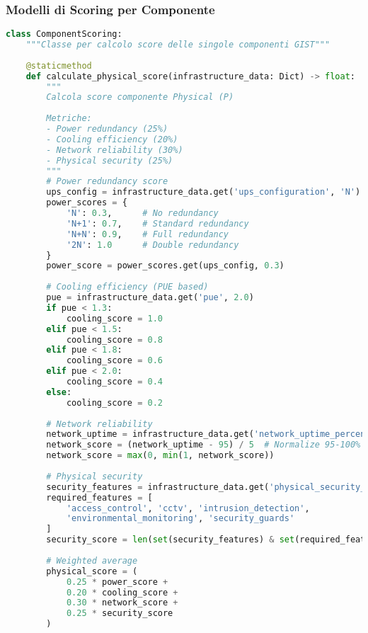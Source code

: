 \subsubsection{Modelli di Scoring per Componente}

\begin{lstlisting}[language=Python, caption=Calcolo Score Componenti GIST]
class ComponentScoring:
    """Classe per calcolo score delle singole componenti GIST"""
    
    @staticmethod
    def calculate_physical_score(infrastructure_data: Dict) -> float:
        """
        Calcola score componente Physical (P)
        
        Metriche:
        - Power redundancy (25%)
        - Cooling efficiency (20%)
        - Network reliability (30%)
        - Physical security (25%)
        """
        # Power redundancy score
        ups_config = infrastructure_data.get('ups_configuration', 'N')
        power_scores = {
            'N': 0.3,      # No redundancy
            'N+1': 0.7,    # Standard redundancy
            'N+N': 0.9,    # Full redundancy
            '2N': 1.0      # Double redundancy
        }
        power_score = power_scores.get(ups_config, 0.3)
        
        # Cooling efficiency (PUE based)
        pue = infrastructure_data.get('pue', 2.0)
        if pue < 1.3:
            cooling_score = 1.0
        elif pue < 1.5:
            cooling_score = 0.8
        elif pue < 1.8:
            cooling_score = 0.6
        elif pue < 2.0:
            cooling_score = 0.4
        else:
            cooling_score = 0.2
        
        # Network reliability
        network_uptime = infrastructure_data.get('network_uptime_percent', 99.0)
        network_score = (network_uptime - 95) / 5  # Normalize 95-100% to 0-1
        network_score = max(0, min(1, network_score))
        
        # Physical security
        security_features = infrastructure_data.get('physical_security_features', [])
        required_features = [
            'access_control', 'cctv', 'intrusion_detection', 
            'environmental_monitoring', 'security_guards'
        ]
        security_score = len(set(security_features) & set(required_features)) / len(required_features)
        
        # Weighted average
        physical_score = (
            0.25 * power_score +
            0.20 * cooling_score +
            0.30 * network_score +
            0.25 * security_score
        )
        

\end{lstlisting}
